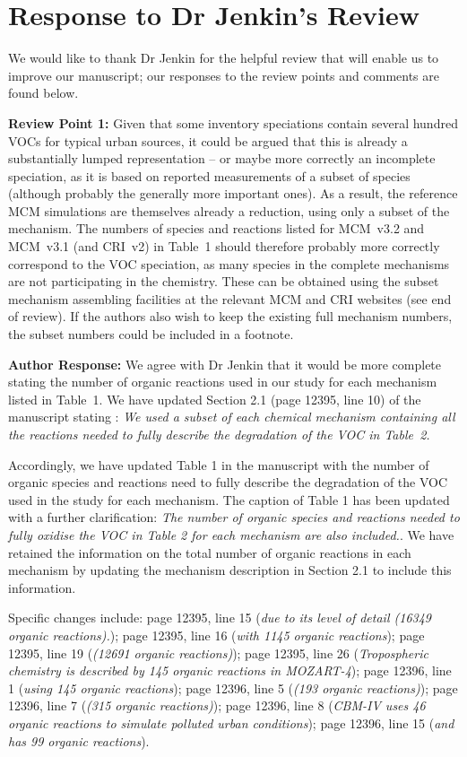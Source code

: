 \documentclass{article}
\begin{document}
\section*{Response to Dr Jenkin's Review}

We would like to thank Dr Jenkin for the helpful review that will enable us to improve our manuscript; our responses to the review points and comments are found below.

\textbf{Review Point 1:} Given that some inventory speciations contain several hundred VOCs for typical urban sources, it could be argued that this is already a substantially lumped representation – or maybe more correctly an incomplete speciation, as it is based on reported measurements of a subset of species (although probably the generally more important ones). As a result, the reference MCM simulations are themselves already a reduction, using only a subset of the mechanism. The numbers of species and reactions listed for MCM~v3.2 and MCM~v3.1 (and CRI~v2) in Table~1 should therefore probably more correctly correspond to the VOC speciation, as many species in the complete mechanisms are not participating in the chemistry. These can be obtained using the subset mechanism assembling facilities at the relevant MCM and CRI websites (see end of review). If the authors also wish to keep the existing full mechanism numbers, the subset numbers could be included in a footnote.

\textbf{Author Response:} We agree with Dr Jenkin that it would be more complete stating the number of organic reactions used in our study for each mechanism listed in Table~1. 
We have updated Section 2.1 (page 12395, line 10) of the manuscript stating :
\textit{We used a subset of each chemical mechanism containing all the reactions needed to fully describe the degradation of the VOC in Table~2.  }

Accordingly, we have updated Table 1 in the manuscript with the number of organic species and reactions need to fully describe the degradation of the VOC used in the study for each mechanism. 
The caption of Table 1 has been updated with a further clarification: \textit{The number of organic species and reactions needed to fully oxidise the VOC in Table 2 for each mechanism are also included.}.
We have retained the information on the total number of organic reactions in each mechanism by updating the mechanism description in Section 2.1 to include this information.

Specific changes include: page 12395, line 15 (\textit{due to its level of detail (16349 organic reactions).}); page 12395, line 16 (\textit{with 1145 organic reactions}); page 12395, line 19 (\textit{(12691 organic reactions)}); page 12395, line 26 (\textit{Tropospheric chemistry is described by 145 organic reactions in MOZART-4}); page 12396, line 1 (\textit{using 145 organic reactions}); page 12396, line 5 (\textit{(193 organic reactions)}); page 12396, line 7 (\textit{(315 organic reactions)}); page 12396, line 8 (\textit{CBM-IV uses 46 organic reactions to simulate polluted urban conditions}); page 12396, line 15 (\textit{and has 99 organic reactions}).
\end{document}

